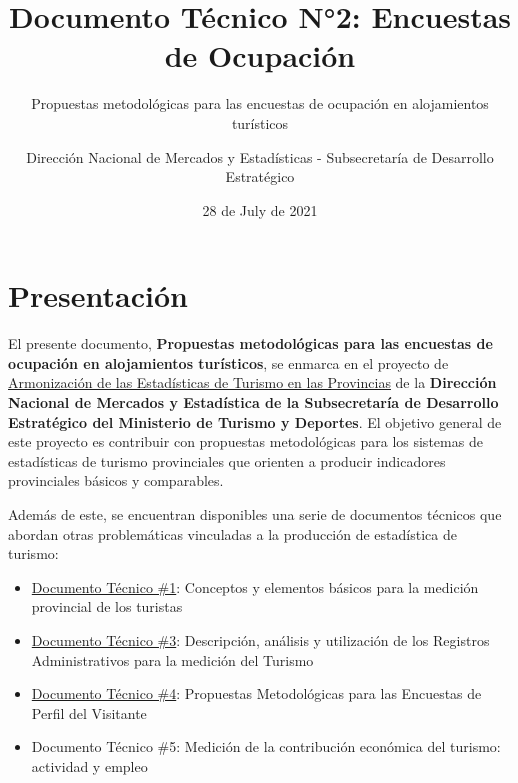 \documentclass[
]{book}
\title{Documento Técnico N°2: Encuestas de Ocupación}
\subtitle{Propuestas metodológicas para las encuestas de ocupación en alojamientos turísticos}
\author{Dirección Nacional de Mercados y Estadísticas - Subsecretaría de Desarrollo Estratégico}
\date{28 de July de 2021}
\let\oldmaketitle\maketitle
\begin{document}
\maketitle


\newpage

\let\maketitle\oldmaketitle
\maketitle

{
\setcounter{tocdepth}{1}
\tableofcontents
}
\hypertarget{presentaciuxf3n}{%
\chapter*{Presentación}\label{presentaciuxf3n}}

El presente documento, \textbf{Propuestas metodológicas para las encuestas de ocupación en alojamientos turísticos}, se enmarca en el proyecto de \href{https://armonizacion.yvera.tur.ar//}{Armonización de las Estadísticas de Turismo en las Provincias} de la \textbf{Dirección Nacional de Mercados y Estadística de la Subsecretaría de Desarrollo Estratégico del Ministerio de Turismo y Deportes}. El objetivo general de este proyecto es contribuir con propuestas metodológicas para los sistemas de estadísticas de turismo provinciales que orienten a producir indicadores provinciales básicos y comparables.

Además de este, se encuentran disponibles una serie de documentos técnicos que abordan otras problemáticas vinculadas a la producción de estadística de turismo:

\begin{itemize}
\item
  \href{https://dnme-minturdep.github.io/DT1_medicion_turismo/}{Documento Técnico \#1}: Conceptos y elementos básicos para la medición provincial de los turistas
\item
  \href{https://dnme-minturdep.github.io/DT3_registros_adminsitrativos/}{Documento Técnico \#3}: Descripción, análisis y utilización de los Registros Administrativos para la medición del Turismo
\item
  \href{https://dnme-minturdep.github.io/DT4_perfiles/}{Documento Técnico \#4}: Propuestas Metodológicas para las Encuestas de Perfil del Visitante
\item
  Documento Técnico \#5: Medición de la contribución económica del turismo: actividad y empleo
\end{itemize}
\end{document}
